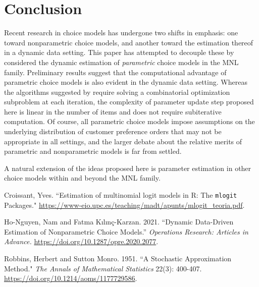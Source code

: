 \documentclass[preprint,12pt,authoryear]{elsarticle}
\begin{document}
\section{Conclusion}
Recent research in choice models has undergone two shifts in emphasis: one toward nonparametric choice models, and another toward the estimation thereof in a dynamic data setting. This paper has attempted to decouple these  by considered the dynamic estimation of \emph{parametric} choice models in the MNL family. Preliminary results suggest that the computational advantage of parametric choice models is also evident in the dynamic data setting. Whereas the algorithms suggested by \cite{honguyen2021} require solving a combinatorial optimization subproblem at each iteration, the complexity of parameter update step proposed here is linear in the number of items and does not require subiterative computation. Of course, all parametric choice models impose assumptions on the underlying distribution of customer preference orders that may not be appropriate in all settings, and the larger debate about the relative merits of parametric and nonparametric models is far from settled.

A natural extension of the ideas proposed here is parameter estimation in other choice models within and beyond the MNL family. 





\begin{thebibliography}{00}

Croissant, Yves. ``Estimation of multinomial logit models in R: The \texttt{mlogit} Packages." {\url{https://www-eio.upc.es/teaching/madt/apunts/mlogit_teoria.pdf}}. 

Ho-Nguyen, Nam and Fatma Kılınç-Karzan. 2021. ``Dynamic Data-Driven Estimation of Nonparametric Choice Models.'' \emph{Operations Research: Articles in Advance.} {\url{https://doi.org/10.1287/opre.2020.2077}}.

Robbins, Herbert and Sutton Monro. 1951. ``A Stochastic Approximation Method." \emph{The Annals of Mathematical Statistics} 22(3): 400-407. {\url{https://doi.org/10.1214/aoms/1177729586}}. 


\end{thebibliography}
\end{document}
